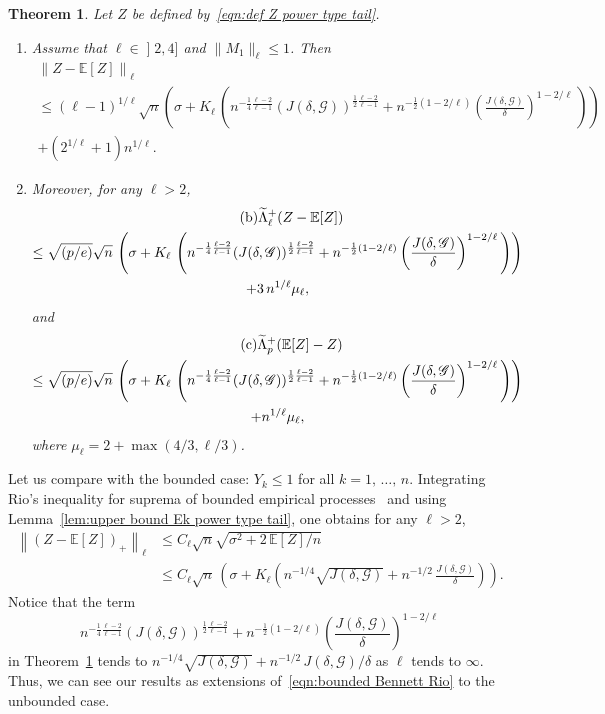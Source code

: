 \documentclass[10pt]{amsart}
\newtheorem{theo}{Theorem}[section]
\theoremstyle{definition}\newtheorem{defi}[theo]{Definition}\newtheorem{rema}[theo]{Remark}\newtheorem{exam}[theo]{Example}\newtheorem{exem}[theo]{Example}\newtheorem{nota}[theo]{Notation}
\newcommand{\bE}{\mathbb{E}}
\newcommand{\caG}{\mathscr{G}}
\newcommand{\intervalleof}[2]{\mathopen{]} #1\mathclose{}\mathpunct{},#2\mathclose{]}}
\newcommand*{\romanenumi}{\renewcommand*{\theenumi}{\roman{enumi}}}
\let\oldtilde\tilde
\renewcommand*{\tilde}[1]{\mathchoice{\widetilde{#1}}{\widetilde{#1}}{\oldtilde{#1}}{\oldtilde{#1}}}
\begin{document}
\begin{theo}\label{thm:result power type tail}
Let $Z$ be defined by~\eqref{eqn:def Z power type tail}.
\begin{enumerate}\romanenumi
\item Assume that $\ell\in\intervalleof 24$ and $\|M_1\|_\ell\leq 1$. Then
\begin{multline}\label{theo2.11.a}
\tag{$\rm a$}
\left\|Z-\bE[Z]\right\|_\ell\\
\leq(\ell-1)^{1/\ell}\sqrt{n}\left(\sigma+K_\ell\,\left(n^{-\frac 14\frac{\ell-2}{\ell-1}}(J(\delta,\caG))^{\frac 12\frac{\ell-2}{\ell-1}}+n^{-\frac 12(1-2/\ell)}\left(\frac{J(\delta,\caG)}{\delta}\right)^{1-2/\ell}\,\right)\right) \\+ \left(2^{1/\ell}+1\right)n^{1/\ell}.
\end{multline}
\item Moreover, for any $\ell>2$,
\begin{multline}\label{theo2.11.b}
\tag{$\rm b$}
\tilde\Lambda_\ell^+(Z-\bE[Z])\\
\leq \sqrt{(p/e)}\sqrt n\,\left(\sigma+K_\ell\,\left(n^{-\frac 14\frac{\ell-2}{\ell-1}}(J(\delta,\caG))^{\frac 12\frac{\ell-2}{\ell-1}}+n^{-\frac 12(1-2/\ell)}\left(\frac{J(\delta,\caG)}{\delta}\right)^{1-2/\ell}\,\right)\right)\\+3\,n^{1/\ell}\mu_\ell,
\end{multline}
and
\begin{multline}\label{theo2.11.c}
\tag{$\rm c$}
\tilde\Lambda_p^+(\bE[Z]-Z)\\
\leq \sqrt{(p/e)}\sqrt n\,\left(\sigma+K_\ell\,\left(n^{-\frac 14\frac{\ell-2}{\ell-1}}(J(\delta,\caG))^{\frac 12\frac{\ell-2}{\ell-1}}+n^{-\frac 12(1-2/\ell)}\left(\frac{J(\delta,\caG)}{\delta}\right)^{1-2/\ell}\,\right)\right)\\+n^{1/\ell}\mu_\ell,
\end{multline}
where $\mu_\ell=2+\max(4/3,\ell/3)$.
\end{enumerate}
\end{theo}

Let us compare with the bounded case: $Y_k\leq 1$ for all $k=1,\,\ldots,\,n$. Integrating Rio's inequality for suprema of bounded empirical processes~\cite[Theorem~1]{Rio02} and using Lemma~\ref{lem:upper bound Ek power type tail}, one obtains for any $\ell>2$,
\begin{align}\label{eqn:bounded Bennett Rio}
\left\|(Z-\bE[Z])_+\right\|_\ell &\leq C_\ell\sqrt n\sqrt{\sigma^2+2\,\bE[Z]/n}\\
&\leq C_\ell\sqrt n\,\left(\sigma + K_\ell\left(n^{-1/4}\sqrt{J(\delta,\caG)}+n^{-1/2}\,\frac{J(\delta,\caG)}{\delta}\right)\right).
\end{align}
Notice that the term
\[
n^{-\frac 14\frac{\ell-2}{\ell-1}}(J(\delta,\caG))^{\frac 12\frac{\ell-2}{\ell-1}}+n^{-\frac 12(1-2/\ell)}\left(\frac{J(\delta,\caG)}{\delta}\right)^{1-2/\ell}
\]
in Theorem~\ref{thm:result power type tail} tends to $n^{-1/4}\sqrt{J(\delta,\caG)}+n^{-1/2}\,J(\delta,\caG)/\delta$ as $\ell$ tends to $\infty$. Thus, we can see our results as extensions of~\eqref{eqn:bounded Bennett Rio} to the unbounded case.
\end{document}
